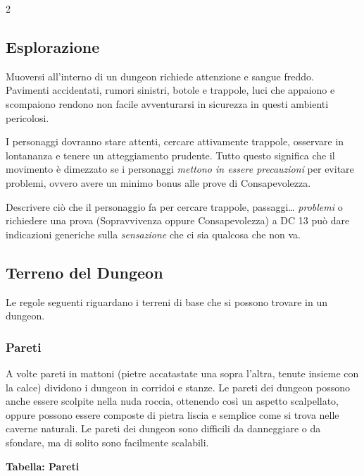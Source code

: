 \begin{multicols}{2}
\subsection{Esplorazione}

Muoversi all'interno di un dungeon richiede attenzione e sangue freddo. Pavimenti accidentati, rumori sinistri, botole e trappole, luci che appaiono e scompaiono rendono non facile avventurarsi in sicurezza in questi ambienti pericolosi.

I personaggi dovranno stare attenti, cercare attivamente trappole, osservare in lontananza e tenere un atteggiamento prudente. Tutto questo significa che il movimento è dimezzato se i personaggi \emph{mettono in essere precauzioni} per evitare problemi, ovvero avere un minimo bonus alle prove di Consapevolezza.

Descrivere ciò che il personaggio fa per cercare trappole, passaggi… \emph{problemi} o richiedere una prova (Sopravvivenza oppure Consapevolezza) a DC 13 può dare indicazioni generiche sulla \emph{sensazione} che ci sia qualcosa che non va.

\subsection{Terreno del Dungeon}

Le regole seguenti riguardano i terreni di base che si possono trovare in un dungeon.

\subsubsection{Pareti}\label{pareti}\hypertarget{pareti}{}

A volte pareti in mattoni (pietre accatastate una sopra l'altra, tenute insieme con la calce) dividono i dungeon in corridoi e stanze. Le pareti dei dungeon possono anche essere scolpite nella nuda roccia, ottenendo così un aspetto scalpellato, oppure possono essere composte di pietra liscia e semplice come si trova nelle caverne naturali. Le pareti dei dungeon sono difficili da danneggiare o da sfondare, ma di solito sono facilmente scalabili.

\end{multicols}
\textbf{Tabella: Pareti}
\medskip

